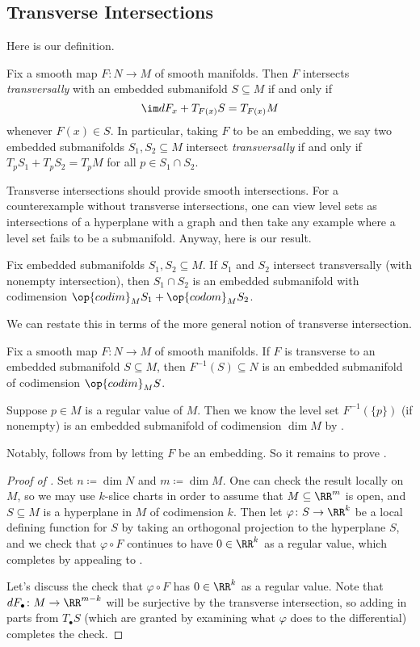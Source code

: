 \documentclass[../notes.tex]{subfiles}
\begin{document}
\subsection{Transverse Intersections}
Here is our definition.
\begin{definition}[transverse]
	Fix a smooth map $F\colon N\to M$ of smooth manifolds. Then $F$ intersects \textit{transversally} with an embedded submanifold $S\subseteq M$ if and only if
	\[\im dF_x+T_{F(x)}S=T_{F(x)}M\]
	whenever $F(x)\in S$. In particular, taking $F$ to be an embedding, we say two embedded submanifolds $S_1,S_2\subseteq M$ intersect \textit{transversally} if and only if $T_pS_1+T_pS_2=T_pM$ for all $p\in S_1\cap S_2$. 
\end{definition}
Transverse intersections should provide smooth intersections. For a counterexample without transverse intersections, one can view level sets as intersections of a hyperplane with a graph and then take any example where a level set fails to be a submanifold. Anyway, here is our result.
\begin{theorem} \label{thm:intersect-subman-transverse}
	Fix embedded submanifolds $S_1,S_2\subseteq M$. If $S_1$ and $S_2$ intersect transversally (with nonempty intersection), then $S_1\cap S_2$ is an embedded submanifold with codimension $\op{codim}_MS_1+\op{codom}_MS_2$.
\end{theorem}
We can restate this in terms of the more general notion of transverse intersection.
\begin{theorem} \label{thm:intersect-map-transverse}
	Fix a smooth map $F\colon N\to M$ of smooth manifolds. If $F$ is transverse to an embedded submanifold $S\subseteq M$, then $F^{-1}(S)\subseteq N$ is an embedded submanifold of codimension $\op{codim}_MS$.
\end{theorem}
\begin{example}
	Suppose $p\in M$ is a regular value of $M$. Then we know the level set $F^{-1}(\{p\})$ (if nonempty) is an embedded submanifold of codimension $\dim M$ by .
\end{example}
Notably,  follows from  by letting $F$ be an embedding. So it remains to prove .
\begin{proof}[Proof of ]
	Set $n\coloneqq\dim N$ and $m\coloneqq\dim M$. One can check the result locally on $M$, so we may use $k$-slice charts in order to assume that $M\subseteq\RR^m$ is open, and $S\subseteq M$ is a hyperplane in $M$ of codimension $k$. Then let $\varphi\colon S\to\RR^k$ be a local defining function for $S$ by taking an orthogonal projection to the hyperplane $S$, and we check that $\varphi\circ F$ continues to have $0\in\RR^k$ as a regular value, which completes by appealing to .

	Let's discuss the check that $\varphi\circ F$ has $0\in\RR^k$ as a regular value. Note that $dF_\bullet\colon M\to\RR^{m-k}$ will be surjective by the transverse intersection, so adding in parts from $T_\bullet S$ (which are granted by examining what $\varphi$ does to the differential) completes the check.
\end{proof}
\end{document}
